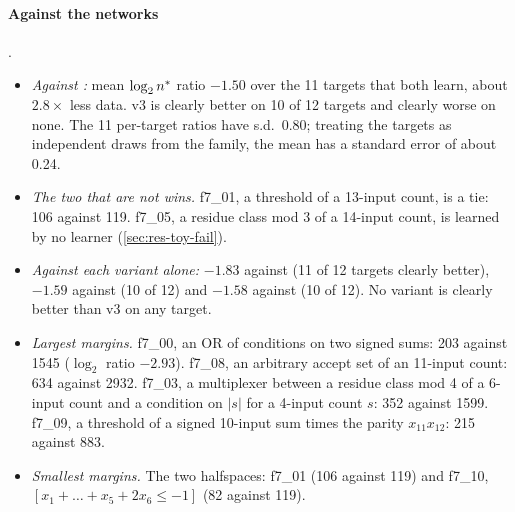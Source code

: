 \paragraph{Against the networks} .
\begin{itemize}
\item \emph{Against :} mean $\log_2n^{*}$ ratio $-1.50$ over the 11 targets that both learn, about $2.8\times$ less data. v3 is clearly better on 10 of 12 targets and clearly worse on none. The 11 per-target ratios have s.d.\ 0.80; treating the targets as independent draws from the family, the mean has a standard error of about 0.24.
\item \emph{The two that are not wins.} f7\_01, a threshold of a 13-input count, is a tie: 106 against 119. f7\_05, a residue class mod 3 of a 14-input count, is learned by no learner (\cref{sec:res-toy-fail}).
\item \emph{Against each variant alone:} $-1.83$ against  (11 of 12 targets clearly better), $-1.59$ against  (10 of 12) and $-1.58$ against  (10 of 12). No variant is clearly better than v3 on any target.
\item \emph{Largest margins.} f7\_00, an OR of conditions on two signed sums: 203 against 1545 ($\log_2$ ratio $-2.93$). f7\_08, an arbitrary accept set of an 11-input count: 634 against 2932. f7\_03, a multiplexer between a residue class mod 4 of a 6-input count and a condition on $|s|$ for a 4-input count $s$: 352 against 1599. f7\_09, a threshold of a signed 10-input sum times the parity $x_{11}x_{12}$: 215 against 883.
\item \emph{Smallest margins.} The two halfspaces: f7\_01 (106 against 119) and f7\_10, $[x_1+\dots+x_5+2x_6\le-1]$ (82 against 119).
\end{itemize}

